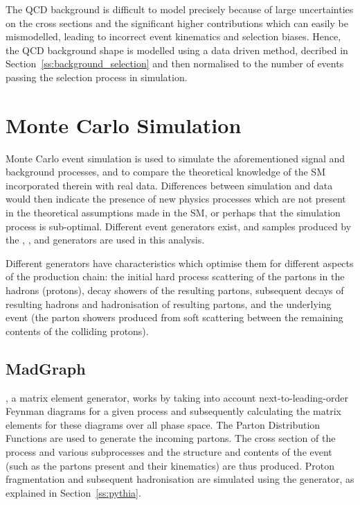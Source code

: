 The QCD background is difficult to model precisely because of large uncertainties on the cross sections and
the significant higher contributions which can easily be mismodelled, leading to incorrect event kinematics
and selection biases. Hence, the QCD background shape is modelled using a data driven method, decribed in
Section~\ref{ss:background_selection} and then normalised to the number of events passing the selection
process in simulation.

\section{Monte Carlo Simulation}
\label{s:monte_carlo_simulation}

Monte Carlo event simulation is used to simulate the aforementioned signal and background processes, and to
compare the theoretical knowledge of the SM incorporated therein with real data. Differences
between simulation and data would then indicate the presence of new physics processes which are not present in
the theoretical assumptions made in the SM, or perhaps that the simulation process is sub-optimal.
Different event generators exist, and samples produced by the \MADGRAPH, \PYTHIA, \POWHEG and \HERWIG
generators are used in this analysis.

Different generators have characteristics which optimise them for different aspects of the production chain:
the initial hard process scattering of the partons in the hadrons (protons), decay showers of the resulting
partons, subsequent decays of resulting hadrons and hadronisation of resulting partons, and the underlying
event (the parton showers produced from soft scattering between the remaining contents of the colliding
protons). 

\subsection{MadGraph}
\label{ss:madgraph}
\MADGRAPH \cite{madgraph5}, a matrix element generator, works by taking into account next-to-leading-order
Feynman diagrams for a given process and subsequently calculating the matrix elements for these diagrams over
all phase space. The Parton Distribution Functions are used to generate the incoming partons.
The cross section of the process and various subprocesses and the structure and contents of the event (such as
the partons present and their kinematics) are thus produced. %
Proton fragmentation and subsequent hadronisation are simulated using the \PYTHIA generator, as explained in
Section~\ref{ss:pythia}.

